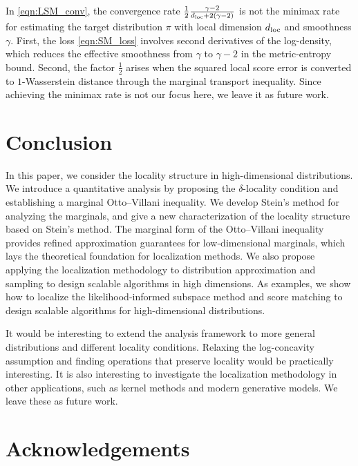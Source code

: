 \documentclass[11pt]{article}
\begin{document}
\begin{rem}
In \eqref{eqn:LSM_conv}, the convergence rate $ \frac{1}{2} \frac{\gamma-2}{d_{\rm loc} + 2(\gamma-2)} $ is not the minimax rate for estimating the target distribution $\pi$ with local dimension $d_{\rm loc}$ and smoothness $\gamma$.
%
First, the loss \eqref{eqn:SM_loss} involves second derivatives of the log-density, which reduces the effective smoothness from $\gamma$ to $\gamma-2$ in the metric-entropy bound.
%
Second, the factor $\frac{1}{2}$ arises when the squared local score error is converted to $1$-Wasserstein distance through the marginal transport inequality.
%
Since achieving the minimax rate is not our focus here, we leave it as future work.
\end{rem}





\section{Conclusion}
\label{sec:con}

In this paper, we consider the locality structure in high-dimensional distributions.
We introduce a quantitative analysis by proposing the $\delta$-locality condition and establishing a marginal Otto--Villani inequality. 
We develop Stein's method for analyzing the marginals, and give a new characterization of the locality structure based on Stein's method. 
The marginal form of the Otto--Villani inequality provides refined approximation guarantees for low-dimensional marginals, which lays the theoretical foundation for localization methods. 
We also propose applying the localization methodology to distribution approximation and sampling to design scalable algorithms in high dimensions.
As examples, we show how to localize the likelihood-informed subspace method and score matching to design scalable algorithms for high-dimensional distributions.

It would be interesting to extend the analysis framework to more general distributions and different locality conditions. Relaxing the log-concavity assumption and finding operations that preserve locality would be practically interesting. It is also interesting to investigate the localization methodology in other applications, such as kernel methods and modern generative models. We leave these as future work.

\section*{Acknowledgements}
\end{document}
